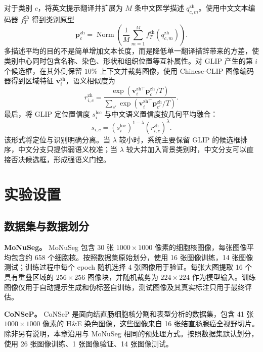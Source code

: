 对于类别 $c$，将英文提示翻译并扩展为 $M$ 条中文医学描述 $q_{c,m}^{\mathrm{zh}}$。使用中文文本编码器 $f_T^{\mathrm{zh}}$ 得到类别原型
\begin{equation}
\boldsymbol p_c^{\mathrm{zh}}
=\operatorname{Norm}\left(
\frac{1}{M}\sum_{m=1}^{M}
f_T^{\mathrm{zh}}(q_{c,m}^{\mathrm{zh}})
\right).
\end{equation}
多描述平均的目的不是简单增加文本长度，而是降低单一翻译措辞带来的方差，使类别中心同时包含名称、染色、形状和组织位置等互补属性。对 GLIP 产生的第 $i$ 个候选框，在其外侧保留 $10\%$ 上下文并裁剪图像，使用 Chinese-CLIP 图像编码器得到区域特征 $\boldsymbol v_i^{\mathrm{zh}}$，语义相似度为
\begin{equation}
r_{i,c}^{\mathrm{zh}}
=\frac{
\exp(\boldsymbol v_i^{\mathrm{zh}\top}
\boldsymbol p_c^{\mathrm{zh}}/T)}
{\sum_{c'}\exp(
\boldsymbol v_i^{\mathrm{zh}\top}
\boldsymbol p_{c'}^{\mathrm{zh}}/T)}.
\end{equation}
最后，将 GLIP 定位置信度 $s_i^{\mathrm{loc}}$ 与中文语义置信度按几何平均融合：
\begin{equation}
s_{i,c}
=(s_i^{\mathrm{loc}})^{1-\lambda}
(r_{i,c}^{\mathrm{zh}})^{\lambda}.
\end{equation}
该形式将定位与识别明确分离。当 $\lambda$ 较小时，系统主要保留 GLIP 的候选框排序，中文分支只提供弱语义校准；当 $\lambda$ 较大并加入背景类别时，中文分支可以直接否决候选框，形成强语义门控。

\section{实验设置}

\subsection{数据集与数据划分}

\textbf{MoNuSeg。} MoNuSeg 包含 30 张 $1000\times1000$ 像素的细胞核图像，每张图像平均包含约 658 个细胞核。按照数据集原始划分，使用 16 张图像训练，14 张图像测试；训练过程中每个 epoch 随机选择 4 张图像用于验证。每张大图提取 16 个具有重叠区域的 $256\times256$ 图像块，并随机裁剪为 $224\times224$ 作为模型输入。训练图像仅用于自动提示生成和伪标签自训练，测试图像及其真实标注只用于最终评估。

\textbf{CoNSeP。} CoNSeP 是面向结直肠细胞核分割和表型分析的数据集，包含 41 张 $1000\times1000$ 像素的 H\&E 染色图像，这些图像来自 16 张结直肠腺癌全视野切片。除非另有说明，本章沿用与 MoNuSeg 相同的预处理方式。按照数据集默认划分，使用 26 张图像训练、1 张图像验证、14 张图像测试。

